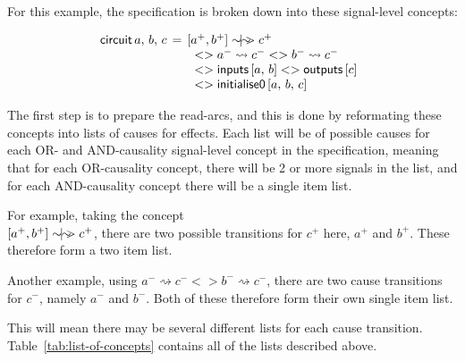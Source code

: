 \documentclass[british,conference,compsoc]{IEEEtran}
\begin{document}
For this example, the specification is broken down into these signal-level 
concepts:

\vspace{-4mm}
\[
\begin{array}{lcl}
\hspace{-2mm}\mathsf{circuit}\,a,\,b,\,c&\hspace{-2mm}=
	&\hspace{-2mm}[a^{+}, b^{+}]
	\sim\hspace{-1.5mm}|\hspace{-1.5mm}\sim\hspace{-1.5mm}>c^{+}\\
~&\hspace{-2mm}&<>a^{-}\rightsquigarrow c^{-} <> b^{-}\rightsquigarrow c^{-}\\
~&\hspace{-2mm}&<> \mathsf{inputs} \, [a,\,b] <>\mathsf{outputs}\,[c] \\
~&\hspace{-2mm}&<>\mathsf{initialise0}\,[a,\,b,\,c]
\end{array}
\]

\vspace{-1mm}

\noindent The first step is to prepare the read-arcs, and this is done by
reformating these concepts into lists of causes for effects.
Each list will be of possible causes for each OR- and AND-causality signal-level
concept in the specification, meaning that for each OR-causality concept, 
there will be 2 or more signals in the list, and for each AND-causality 
concept there will be a single item list.

For example, taking the concept\\$[a^{+}, b^{+}]
\sim\hspace{-1.5mm}|\hspace{-1.5mm}\sim\hspace{-1.5mm}>c^{+}$, there are
two possible transitions for $c^{+}$ here, $a^{+}$ and $b^{+}$. These therefore 
form a two item list. 

Another example, using 
$a^{-}\rightsquigarrow c^{-} <> b^{-}\rightsquigarrow c^{-}$, there are two
cause transitions for $c^{-}$, namely $a^{-}$ and $b^{-}$. Both of these 
therefore form their own single item list. 

This will mean there may be several different lists for each cause transition. 
Table~\ref{tab:list-of-concepts} contains all of the lists described above.

\vspace{-1mm}
\end{document}
